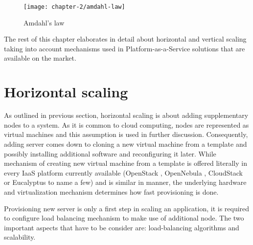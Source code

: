 \begin{figure}[!ht]
  \begin{center}
    \texttt{[image: chapter-2/amdahl-law]}
  \end{center}
  \caption{Amdahl's law}
  \label{ch2:amdahl-law}
\end{figure}

The rest of this chapter elaborates in detail about horizontal and vertical scaling taking into account mechanisms used in Platform-as-a-Service solutions that are available on the market.

\section{Horizontal scaling}
As outlined in previous section, horizontal scaling is about adding supplementary nodes to a system. As it is common to cloud computing, nodes are represented as virtual machines and this assumption is used in further discussion. Consequently, adding server comes down to cloning a new virtual machine from a template and possibly installing additional software and reconfiguring it later. While mechanism of creating new virtual machine from a template is offered literally in every IaaS platform currently available (OpenStack \cite{OpenStack}, OpenNebula \cite{OpenNebula}, CloudStack \cite{CloudStack} or Eucalyptus \cite{Eucalyptus} to name a few) and is similar in manner, the underlying hardware and virtualization mechanism determines how fast provisioning is done. 

Provisioning new server is only a first step in scaling an application, it is required to configure load balancing mechanism to make use of additional node. The two important aspects that have to be consider are: load-balancing algorithms and scalability.

